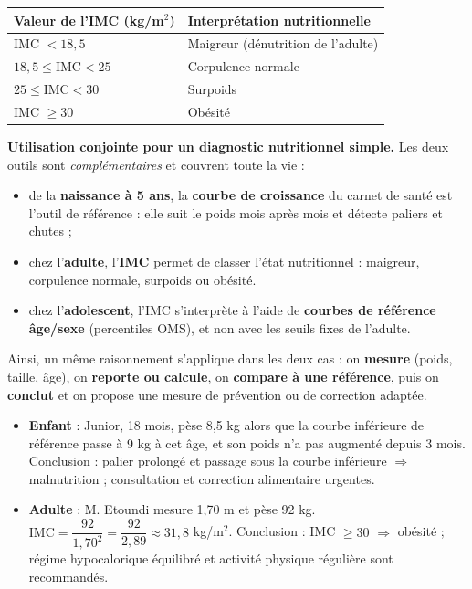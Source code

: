 \documentclass[11pt]{article}
\begin{document}
\begin{center}
\begin{tabularx}{\linewidth}{|l|X|}\hline
\rowcolor{popblueL} \textbf{Valeur de l'IMC (kg/m$^2$)} & \textbf{Interprétation nutritionnelle} \\ \hline
IMC $< 18{,}5$ & Maigreur (dénutrition de l'adulte) \\ \hline
$18{,}5 \leq \mathrm{IMC} < 25$ & Corpulence normale \\ \hline
$25 \leq \mathrm{IMC} < 30$ & Surpoids \\ \hline
IMC $\geq 30$ & Obésité \\ \hline
\end{tabularx}
\end{center}

\textbf{Utilisation conjointe pour un diagnostic nutritionnel simple.} Les deux outils sont \emph{complémentaires} et couvrent toute la vie :
\begin{itemize}
\item de la \textbf{naissance à 5 ans}, la \textbf{courbe de croissance} du carnet de santé est l'outil de référence : elle suit le poids mois après mois et détecte paliers et chutes ;
\item chez l'\textbf{adulte}, l'\textbf{IMC} permet de classer l'état nutritionnel : maigreur, corpulence normale, surpoids ou obésité.
\item chez l'\textbf{adolescent}, l'IMC s'interprète à l'aide de \textbf{courbes de référence âge/sexe} (percentiles OMS), et non avec les seuils fixes de l'adulte.
\end{itemize}
Ainsi, un même raisonnement s'applique dans les deux cas : on \textbf{mesure} (poids, taille, âge), on \textbf{reporte ou calcule}, on \textbf{compare à une référence}, puis on \textbf{conclut} et on propose une mesure de prévention ou de correction adaptée.

\begin{exemplebox}
\begin{itemize}
\item \textbf{Enfant} : Junior, 18 mois, pèse 8,5 kg alors que la courbe inférieure de référence passe à 9 kg à cet âge, et son poids n'a pas augmenté depuis 3 mois. Conclusion : palier prolongé et passage sous la courbe inférieure $\Rightarrow$ malnutrition ; consultation et correction alimentaire urgentes.
\item \textbf{Adulte} : M. Etoundi mesure 1,70 m et pèse 92 kg. $\mathrm{IMC} = \dfrac{92}{1{,}70^2} = \dfrac{92}{2{,}89} \approx 31{,}8$ kg/m$^2$. Conclusion : IMC $\geq 30$ $\Rightarrow$ obésité ; régime hypocalorique équilibré et activité physique régulière sont recommandés.
\end{itemize}
\end{exemplebox}
\end{document}
